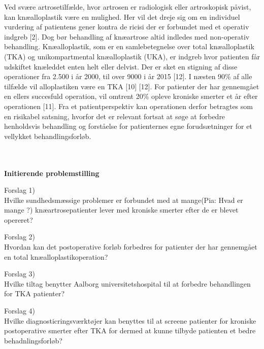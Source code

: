 Ved svære artrosetilfælde, hvor artrosen er radiologisk eller artroskopisk påvist, kan knæalloplastik være en mulighed. Her vil det dreje sig om en individuel vurdering af patientens gener kontra de ricisi der er forbundet med et operativ indgreb [2]. Dog bør behandling af knæartrose altid indledes med non-operativ behandling.
Knæalloplastik, som er en samlebetegnelse over total knæalloplastik (TKA) og unikompartmental knæalloplastik (UKA), er indgreb hvor patienten får udskiftet knæleddet enten helt eller delvist. Der er sket en stigning af disse operationer fra 2.500 i år 2000, til over 9000 i år 2015 [12].  I næsten 90\% af alle tilfælde vil alloplastiken være en TKA [10] [12].
For patienter der har gennemgået en ellers succesfuld operation, vil omtrent 20\% opleve kroniske smerter et år efter operationen [11]. Fra et patientperspektiv kan operationen derfor betragtes som en risikabel satsning, hvorfor det er relevant fortsat at søge at forbedre henholdsvis behandling og forståelse for patienternes egne forudsætninger for et vellykket behandlingsforløb. 

\\\\

\textbf{Initierende problemstilling}

Forslag 1)\\
Hvilke sundhedsmæssige problemer er forbundet med at mange(Pia: Hvad er mange ?)  knæartrosepatienter  lever med kroniske smerter efter de er blevet opereret?



Forslag 2)\\
Hvordan kan det postoperative forløb forbedres for patienter der har gennemgået en total knæalloplastikoperation?



Forslag 3)\\
Hvilke tiltag benytter Aalborg universitetshospital til at forbedre behandlingen for TKA patienter?




Forslag 4)\\
Hvilke diagnosticringsværktøjer kan benyttes til at screene patienter for  kroniske postoperative smerter efter TKA for dermed at kunne tilbyde patienten et bedre behadnlingsforløb?
\\\\


